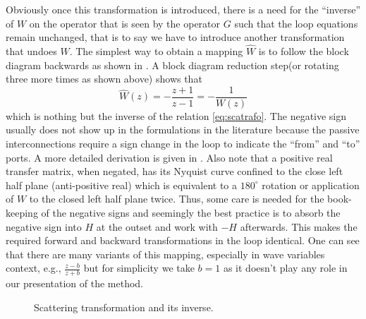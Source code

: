 Obviously once this transformation is introduced, there is a need for the \enquote{inverse} of $W$ on the operator that is seen
by the operator $G$ such that the loop equations remain unchanged, that is to say we have to introduce another transformation that undoes
$W$. The simplest way to obtain a mapping $\hat{W}$ is to follow the block diagram backwards as shown in 
. A block diagram reduction step(or rotating three more times as shown above) shows that 
\[
\hat{W}(z) = -\frac{z+1}{z-1} = -\frac{1}{W(z)}
\]
which is nothing but the inverse of the relation \eqref{eq:scatrafo}. The negative sign usually does not show up in 
the formulations in the literature because the passive interconnections 
require a sign change in the loop to indicate the \enquote{from} and \enquote{to} ports. A more detailed derivation
is given in \cite{colgate3}. Also note that a positive real transfer matrix, when negated, has its Nyquist curve 
confined to the close left half plane (anti-positive real) which is equivalent to a $180^\circ$ rotation or application
of $W$ to the closed left half plane twice. Thus, some care is needed for the book-keeping of the negative signs and 
seemingly the best practice is to absorb the negative sign into $H$ at the outset and work with $-H$ afterwards. This 
makes the required forward and backward transformations in the loop identical. One can see that there are many variants 
of this mapping, especially in wave variables context, e.g., $\frac{z-b}{z+b}$ but for simplicity we take $b=1$ as it 
doesn't play any role in our presentation of the method. 


\begin{figure}%
\centering
{}
\caption[Scattering transformation and its inverse.]{Scattering transformation and its inverse.}%
\label{lit:syn:invscat}%
\end{figure}


